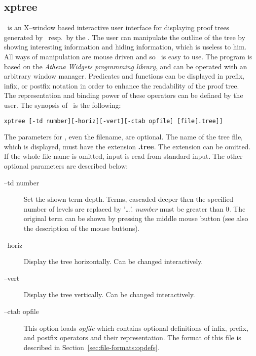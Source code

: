 %
\subsection{xptree}\label{sec:xptree}

\Xp\ is an X--window based interactive  user  interface  for
displaying  proof  trees  generated  by \SE\ resp.\ by the \SAM. The user
can manipulate the outline of the tree  by  showing  interesting
information and hiding information, which is useless to him.
All ways of manipulation are mouse driven and so  \xp\  is easy  to
use.   The  program is based on the {\em Athena Widgets programming
library}, and can be operated with  an  arbitrary window  manager.
Predicates and functions can be displayed in prefix, infix, or postfix
notation in  order  to  enhance the  readability  of the proof tree.
The representation and binding power of these operators can be defined
by the user. The synopsis of \xp\ is the following:
\begin{verbatim}
xptree [-td number][-horiz][-vert][-ctab opfile] [file[.tree]]
\end{verbatim}

The parameters for \xp, even the filename, are optional. The name of
the tree file, which is displayed, must have the extension {\bf
.tree}. The extension can be omitted. If  the whole file  name  is
omitted,  input  is  read from standard input. The other optional
parameters are described below:
\begin{description}
      \item[--td number]
           {Set the shown term depth. Terms, cascaded  deeper  then
            the  specified  number of levels are replaced by '\dots'.
            {\it number\/} must be greater than $0$. The original  term  can
            be shown by pressing the middle mouse button (see also the
            description of the mouse buttons).}
      \item[--horiz]
           {Display the tree horizontally. Can be changed interactively.}
      \item[--vert]
           {Display the tree vertically. Can be changed interactively.}
      \item[--ctab opfile]
           {This  option  loads {\it opfile\/}  which   contains
            optional  definitions  of  infix,  prefix,  and postfix
            operators and their representation.  The format of this
            file is described in Section~\ref{sec:file-formats:opdefs}.}
\end{description}

